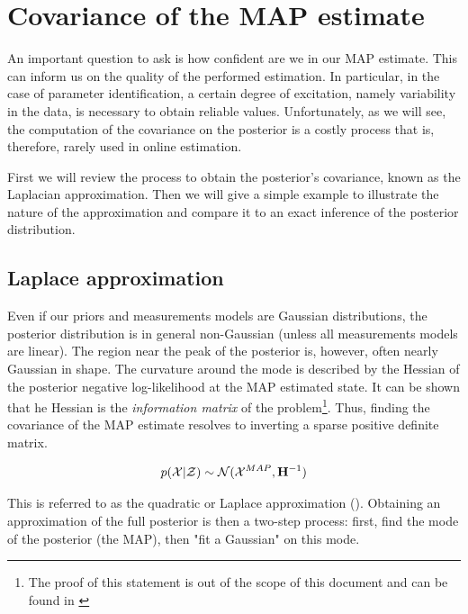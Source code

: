 \appendix




\chapter{Covariance of the MAP estimate}
\label{chp:MAP_covariance}
An important question to ask is how confident are we in our MAP estimate.
This can inform us on the quality of the performed estimation. In particular, in the case of parameter identification, a certain degree of excitation,
namely variability in the data, is necessary to obtain reliable values. Unfortunately, as we will see, the computation of the covariance on the posterior
is a costly process that is, therefore, rarely used in online estimation.

First we will review the process to obtain the posterior's covariance, known as the Laplacian approximation. Then we will give a simple example to
illustrate the nature of the approximation and compare it to an exact inference of the posterior distribution.

\section{Laplace approximation}
\label{sec:map_covariance}
Even if our priors and measurements models are Gaussian distributions, the posterior distribution
is in general non-Gaussian (unless all measurements models are linear). The region near the peak of the posterior is, however, often nearly Gaussian in shape.
The curvature around the mode is described by the Hessian of the posterior negative log-likelihood at the MAP estimated state. 
It can be shown that he Hessian is the \textit{information matrix} of the problem\footnote{The proof of this statement is out of the scope of this document and can be found in
\cite[Section 5.1]{peng2018advanced}}. Thus, finding the covariance of the MAP estimate resolves to inverting a 
sparse positive definite matrix.

\begin{equation}
    p(\mathcal{X} | \mathcal{Z}) \sim \mathcal{N}({\mathcal{X}^{MAP}},{{\bf H}^{-1}})
    \label{eq:map_laplace}
\end{equation}

This is referred to as the quadratic or Laplace approximation (\cite[Section 2.4.2]{mcelreath2018statistical}). Obtaining an approximation of the full posterior is then a two-step process: 
first, find the mode of the posterior (the MAP), then "fit a Gaussian" on this mode. 

